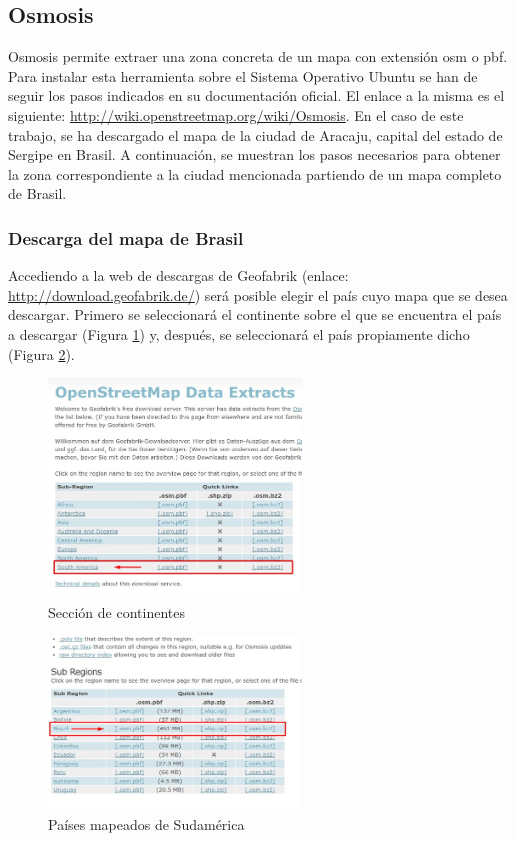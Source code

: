 \subsection{Osmosis}
Osmosis permite extraer una zona concreta de un mapa con extensión osm o pbf. Para instalar esta herramienta sobre el Sistema Operativo Ubuntu se han de seguir los pasos indicados en su documentación oficial. El enlace a la misma es el siguiente: \url{http://wiki.openstreetmap.org/wiki/Osmosis}. En el caso de este trabajo, se ha descargado el mapa de la ciudad de Aracaju, capital del estado de Sergipe en Brasil. A continuación, se muestran los pasos necesarios para obtener la zona correspondiente a la ciudad mencionada partiendo de un mapa completo de Brasil.

\subsubsection{Descarga del mapa de Brasil}
Accediendo a la web de descargas de Geofabrik (enlace: \url{http://download.geofabrik.de/}) será posible elegir el país cuyo mapa que se desea descargar. Primero se seleccionará el continente sobre el que se encuentra el país a descargar (Figura \ref{continente}) y, después, se seleccionará el país propiamente dicho (Figura \ref{pais}).

\begin{figure}[h]
  \centering
    \includegraphics[width=0.6\textwidth]{../img/osmosis_descarga_mapa/continente.jpg}
  \caption{Sección de continentes}
  \label{continente}
\end{figure}

\begin{figure}[h]
  \centering
    \includegraphics[width=0.6\textwidth]{../img/osmosis_descarga_mapa/mapa.jpg}
  \caption{Países mapeados de Sudamérica}
  \label{pais}
\end{figure}

